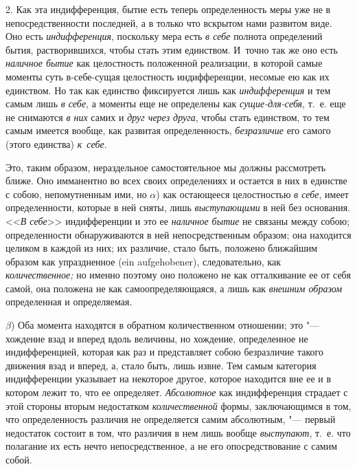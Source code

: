 2. Как эта индифференция, бытие есть теперь определенность меры уже не в
непосредственности последней, а в только что вскрытом нами развитом виде.
Оно есть {\em индифференция}, поскольку мера есть
{\em в себе} полнота определений бытия, растворившихся,
чтобы стать этим единством. И~точно так же оно есть
{\em наличное бытие} как целостность положенной
реализации, в которой самые моменты суть в-себе-сущая целостность
индифференции, несомые ею как их единством. Но так как единство фиксируется
лишь как {\em индифференция} и тем самым лишь
{\em в себе}, а моменты еще не определены как
{\em сущие-для-себя}, т.~е. еще не снимаются
{\em в них} самих и {\em друг через
друга}, чтобы стать единством, то тем самым имеется вообще, как развитая
определенность, {\em безразличие} его самого (этого единства) {\em к~себе}.

Это, таким образом, нераздельное самостоятельное мы должны рассмотреть
ближе. Оно имманентно во всех своих определениях и остается в них в
единстве с собою, непомутненным ими, но $\alpha$)
как остающееся целостностью {\em в себе}, имеет
определенности, которые в ней сняты, лишь
{\em выступающими} в ней без основания.
<<{\em В себе}>> индифференции и это ее
{\em наличное бытие} не связаны между собою;
определенности обнаруживаются в ней непосредственным образом; она находится
целиком в каждой из них; их различие, стало быть, положено ближайшим
образом как упраздненное (ein aufgehobener), следовательно, как
{\em количественное;} но именно поэтому оно положено не
как отталкивание ее от себя самой, она положена не как самоопределяющаяся,
а лишь как {\em внешним образом} определенная и определяемая.

$\beta $) Оба момента находятся в обратном
количественном отношении; это "--- хождение взад и вперед вдоль величины, но
хождение, определенное не индифференцией, которая как раз и представляет
собою безразличие такого движения взад и вперед, а, стало быть, лишь извне.
Тем самым категория индифференции указывает на некоторое другое, которое
находится вне ее и в котором лежит то, что ее определяет.
{\em Абсолютное} как индифференция страдает с этой
стороны вторым недостатком {\em количественной} формы,
заключающимся в том, что определенность различия не определяется самим
абсолютным, "--- первый недостаток состоит в том, что различия в нем лишь
вообще {\em выступают}, т.~е. что полагание их есть
нечто непосредственное, а не его опосредствование с самим собой.

